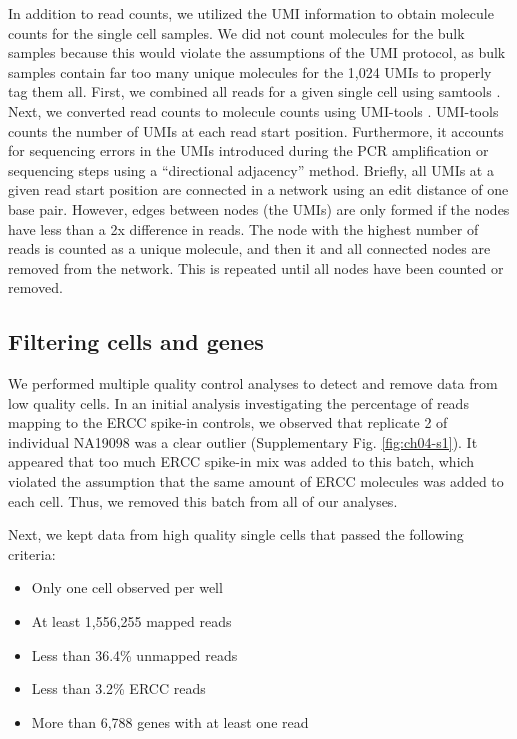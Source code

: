 In addition to read counts, we utilized the UMI information to obtain
molecule counts for the single cell samples. We did not count molecules
for the bulk samples because this would violate the assumptions of the
UMI protocol, as bulk samples contain far too many unique molecules for
the 1,024 UMIs to properly tag them all. First, we combined all reads
for a given single cell using samtools \citep{Li2009}. Next, we converted
read counts to molecule counts using UMI-tools \citep{Smith2016}.
UMI-tools counts the number of UMIs at each read start position.
Furthermore, it accounts for sequencing errors in the UMIs introduced
during the PCR amplification or sequencing steps using a ``directional
adjacency'' method. Briefly, all UMIs at a given read start position are
connected in a network using an edit distance of one base pair. However,
edges between nodes (the UMIs) are only formed if the nodes have less
than a 2x difference in reads. The node with the highest number of reads
is counted as a unique molecule, and then it and all connected nodes are
removed from the network. This is repeated until all nodes have been
counted or removed.

\subsection{Filtering cells and
genes}\label{filtering-cells-and-genes}

We performed multiple quality control analyses to detect and remove data
from low quality cells. In an initial analysis investigating the
percentage of reads mapping to the ERCC spike-in controls, we observed
that replicate 2 of individual NA19098 was a clear outlier
(Supplementary Fig. \ref{fig:ch04-s1}). It appeared that too much ERCC spike-in mix was
added to this batch, which violated the assumption that the same amount
of ERCC molecules was added to each cell. Thus, we removed this batch
from all of our analyses.

Next, we kept data from high quality single cells that passed the
following criteria:

\begin{itemize}
\itemsep1pt\parskip0pt
\item
  Only one cell observed per well
\item
  At least 1,556,255 mapped reads
\item
  Less than 36.4\% unmapped reads
\item
  Less than 3.2\% ERCC reads
\item
  More than 6,788 genes with at least one read
\end{itemize}

